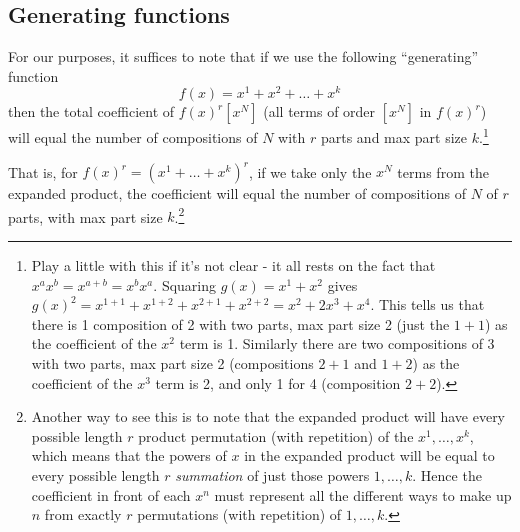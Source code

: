 \documentclass[hidelinks]{article}
\begin{document}
\subsection{Generating functions}
For our purposes, it suffices to note that if we use the following ``generating'' function
\begin{equation}
f(x)=x^1+x^2+\dots+x^k
\end{equation}
then the total coefficient of $f(x)^r[x^N]$ (all terms of order $[x^N]$ in $f(x)^r$) will equal the number of compositions of $N$ with $r$ parts and max part size $k$.\footnote{Play a little with this if it's not clear - it all rests on the fact that $x^ax^b = x^{a+b}=x^bx^a$. Squaring $g(x)=x^1+x^2$ gives $g(x)^2 = x^{1+1}+x^{1+2}+x^{2+1}+x^{2+2} = x^2+2x^3+x^4$. This tells us that there is 1 composition of 2 with two parts, max part size 2 (just the $1+1$) as the coefficient of the $x^2$ term is 1. Similarly there are two compositions of 3 with two parts, max part size 2 (compositions $2+1$ and $1+2$) as the coefficient of the $x^3$ term is 2, and only 1 for 4 (composition $2+2$).}

That is, for $f(x)^r=(x^1+\dots+x^k)^r$, if we take only the $x^N$ terms from the expanded product, the coefficient will equal the number of compositions of $N$ of $r$ parts, with max part size $k$.\footnote{Another way to see this is to note that the expanded product will have every possible length $r$ product permutation (with repetition) of the $x^1, \dots, x^k$, which means that the powers of $x$ in the expanded product will be equal to every possible length $r$ \textit{summation} of just those powers $1, \dots, k$. Hence the coefficient in front of each $x^n$ must represent all the different ways to make up $n$ from exactly $r$ permutations (with repetition) of $1, \dots, k$.}
\end{document}
